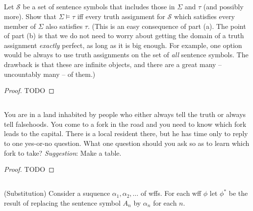 \documentclass{report}
\begin{document}
\subsection{}%

  Let $\mathcal{S}$ be a set of sentence symbols that includes those in $\Sigma$
    and $\tau$ (and possibly more).
  Show that $\Sigma \vDash \tau$ iff every truth assignment for $\mathcal{S}$
    which satisfies every member of $\Sigma$ also satisfies $\tau$.
  (This is an easy consequence of part (a). The point of part (b) is that we do
    not need to worry about getting the domain of a truth assignment
    \textit{exactly} perfect, as long as it is big enough. For example, one
    option would be always to use truth assignments on the set of \textit{all}
    sentence symbols. The drawback is that these are infinite objects, and there
    are a great many -- uncountably many -- of them.)

  \begin{proof}
    TODO
  \end{proof}

\subsection{}%

  You are in a land inhabited by people who either always tell the truth or
    always tell falsehoods.
  You come to a fork in the road and you need to know which fork leads to the
    capital.
  There is a local resident there, but he has time only to reply to one
    yes-or-no question.
  What one question should you ask so as to learn which fork to take?
  \textit{Suggestion}: Make a table.

  \begin{proof}
    TODO
  \end{proof}

\subsection{}%

  (Substitution) Consider a suquence $\alpha_1, \alpha_2, \ldots$ of wffs.
  For each wff $\phi$ let $\phi^*$ be the result of replacing the sentence
    symbol $A_n$ by $\alpha_n$ for each $n$.

\subsubsection{}%
\end{document}
